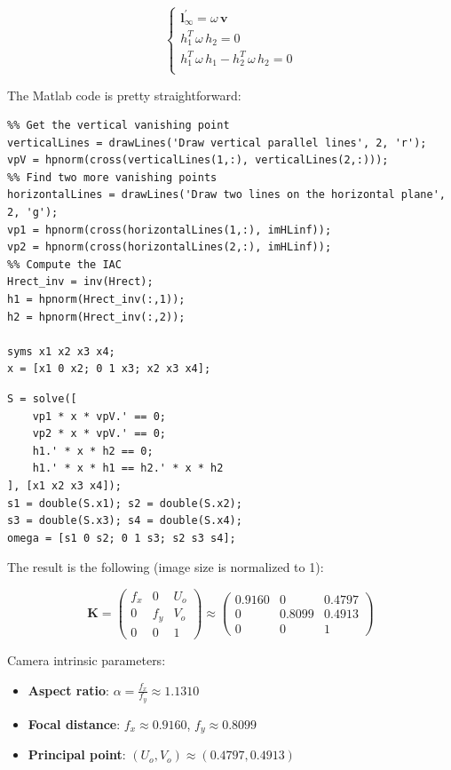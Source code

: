 \documentclass{Configuration_Files/PoliMi3i_thesis}
\begin{document}
\begin{equation}
	\begin{cases}
		\mathbf{l^{'}_\infty} = \omega\,\mathbf{v}\\
		h_1^T\,\omega\,h_2 = 0\\
		h_1^T\,\omega\,h_1 - h_2^T\,\omega\,h_2 = 0\\
	\end{cases}
\end{equation}

The Matlab code is pretty straightforward:

\begin{verbatim}
%% Get the vertical vanishing point
verticalLines = drawLines('Draw vertical parallel lines', 2, 'r');
vpV = hpnorm(cross(verticalLines(1,:), verticalLines(2,:)));
%% Find two more vanishing points
horizontalLines = drawLines('Draw two lines on the horizontal plane', 2, 'g');
vp1 = hpnorm(cross(horizontalLines(1,:), imHLinf));
vp2 = hpnorm(cross(horizontalLines(2,:), imHLinf));	
%% Compute the IAC
Hrect_inv = inv(Hrect);
h1 = hpnorm(Hrect_inv(:,1));
h2 = hpnorm(Hrect_inv(:,2));

syms x1 x2 x3 x4;
x = [x1 0 x2; 0 1 x3; x2 x3 x4];
\end{verbatim}
\newpage
\begin{verbatim}
S = solve([
    vp1 * x * vpV.' == 0;
    vp2 * x * vpV.' == 0;
    h1.' * x * h2 == 0;
    h1.' * x * h1 == h2.' * x * h2
], [x1 x2 x3 x4]);
s1 = double(S.x1); s2 = double(S.x2);
s3 = double(S.x3); s4 = double(S.x4);
omega = [s1 0 s2; 0 1 s3; s2 s3 s4];
\end{verbatim}

The result is the following (image size is normalized to 1):

\[
\mathbf{K} =
\begin{pmatrix}
f_x & 0 & U_o\\
0 & f_y & V_o\\
0 & 0 & 1
\end{pmatrix}
\approx
\begin{pmatrix}
0.9160 & 0 & 0.4797\\
0 & 0.8099 & 0.4913\\
0 & 0 & 1
\end{pmatrix}
\]


Camera intrinsic parameters:
\begin{itemize}
\item \textbf{Aspect ratio}: $\alpha = \frac{f_x}{f_y} \approx 1.1310$
\item \textbf{Focal distance}: $f_x \approx 0.9160$, $f_y \approx 0.8099$
\item \textbf{Principal point}: $(U_o, V_o) \approx (0.4797, 0.4913)$
\end{itemize}
\end{document}
